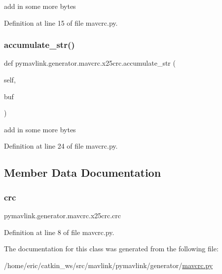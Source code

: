 \begin{DoxyVerb}add in some more bytes\end{DoxyVerb}
 

Definition at line 15 of file mavcrc.\+py.

\mbox{\label{classpymavlink_1_1generator_1_1mavcrc_1_1x25crc_a47f2140fb2e08dae2f4315c86f5c2216}} 
\subsubsection{\texorpdfstring{accumulate\_str()}{accumulate\_str()}}
{\footnotesize\ttfamily def pymavlink.\+generator.\+mavcrc.\+x25crc.\+accumulate\+\_\+str (\begin{DoxyParamCaption}\item[{}]{self,  }\item[{}]{buf }\end{DoxyParamCaption})}

\begin{DoxyVerb}add in some more bytes\end{DoxyVerb}
 

Definition at line 24 of file mavcrc.\+py.



\subsection{Member Data Documentation}
\mbox{\label{classpymavlink_1_1generator_1_1mavcrc_1_1x25crc_a231ac18f30e05e9a81d95534925a318b}} 
\subsubsection{\texorpdfstring{crc}{crc}}
{\footnotesize\ttfamily pymavlink.\+generator.\+mavcrc.\+x25crc.\+crc}



Definition at line 8 of file mavcrc.\+py.



The documentation for this class was generated from the following file\+:\begin{DoxyCompactItemize}
\item 
/home/eric/catkin\+\_\+ws/src/mavlink/pymavlink/generator/\mbox{\hyperlink{mavcrc_8py}{mavcrc.\+py}}\end{DoxyCompactItemize}
